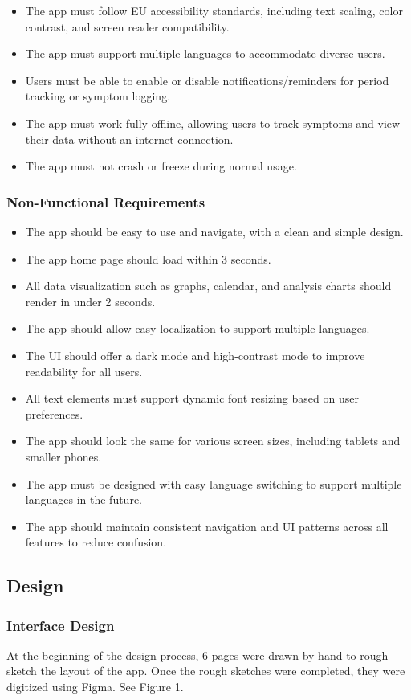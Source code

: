 \begin{itemize}
      \item The app must follow EU accessibility standards, including text scaling, color contrast, and screen reader compatibility.
      \item The app must support multiple languages to accommodate diverse users.
      \item Users must be able to enable or disable notifications/reminders for period tracking or symptom logging.
      \item The app must work fully offline, allowing users to track symptoms and view their data without an internet connection.
      \item The app must not crash or freeze during normal usage.
\end{itemize}

\subsubsection{Non-Functional Requirements}
\begin{itemize}
  \item The app should be easy to use and navigate, with a clean and simple design.
  \item The app home page should load within 3 seconds.
  \item All data visualization such as graphs, calendar, and analysis charts should render in under 2 seconds.
  \item The app should allow easy localization to support multiple languages.
  \item The UI should offer a dark mode and high-contrast mode to improve readability for all users.
  \item All text elements must support dynamic font resizing based on user preferences.
  \item The app should look the same for various screen sizes, including tablets and smaller phones.
  \item The app must be designed with easy language switching to support multiple languages in the future.
  \item The app should maintain consistent navigation and UI patterns across all features to reduce confusion.
\end{itemize}

\subsection{Design}

\subsubsection{Interface Design}
At the beginning of the design process, 6 pages were drawn by hand to rough sketch the layout of the app. Once the rough sketches were completed, they were digitized using Figma. See Figure 1.

